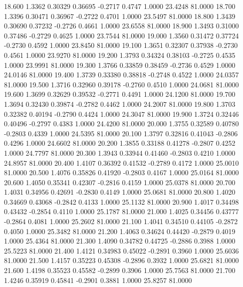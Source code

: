  18.600   1.3362   0.30329   0.36695  -0.2717   0.4747   1.0000  23.4248  81.0000
  18.700   1.3396   0.30471   0.36967  -0.2722   0.4701   1.0000  23.5497  81.0000
  18.800   1.3439   0.30690   0.37232  -0.2726   0.4661   1.0000  23.6558  81.0000
  18.900   1.3493   0.31000   0.37486  -0.2729   0.4625   1.0000  23.7544  81.0000
  19.000   1.3560   0.31472   0.37724  -0.2730   0.4592   1.0000  23.8450  81.0000
  19.100   1.3651   0.32307   0.37938  -0.2730   0.4561   1.0000  23.9270  81.0000
  19.200   1.3793   0.34324   0.38103  -0.2725   0.4535   1.0000  23.9991  81.0000
  19.300   1.3766   0.33859   0.38459  -0.2736   0.4529   1.0000  24.0146  81.0000
  19.400   1.3739   0.33380   0.38818  -0.2748   0.4522   1.0000  24.0357  81.0000
  19.500   1.3716   0.32960   0.39178  -0.2760   0.4510   1.0000  24.0681  81.0000
  19.600   1.3699   0.32629   0.39532  -0.2771   0.4491   1.0000  24.1200  81.0000
  19.700   1.3694   0.32430   0.39874  -0.2782   0.4462   1.0000  24.2007  81.0000
  19.800   1.3703   0.32382   0.40194  -0.2790   0.4424   1.0000  24.3047  81.0000
  19.900   1.3724   0.32446   0.40496  -0.2797   0.4383   1.0000  24.4200  81.0000
  20.000   1.3755   0.32589   0.40780  -0.2803   0.4339   1.0000  24.5395  81.0000
  20.100   1.3797   0.32816   0.41043  -0.2806   0.4296   1.0000  24.6602  81.0000
  20.200   1.3855   0.33188   0.41278  -0.2807   0.4252   1.0000  24.7797  81.0000
  20.300   1.3943   0.33944   0.41460  -0.2803   0.4210   1.0000  24.8957  81.0000
  20.400   1.4107   0.36392   0.41532  -0.2789   0.4172   1.0000  25.0010  81.0000
  20.500   1.4076   0.35826   0.41920  -0.2803   0.4167   1.0000  25.0164  81.0000
  20.600   1.4050   0.35341   0.42307  -0.2816   0.4159   1.0000  25.0378  81.0000
  20.700   1.4031   0.34956   0.42691  -0.2830   0.4149   1.0000  25.0681  81.0000
  20.800   1.4020   0.34669   0.43068  -0.2842   0.4133   1.0000  25.1132  81.0000
  20.900   1.4017   0.34498   0.43432  -0.2854   0.4110   1.0000  25.1787  81.0000
  21.000   1.4025   0.34456   0.43777  -0.2864   0.4081   1.0000  25.2602  81.0000
  21.100   1.4041   0.34510   0.44105  -0.2872   0.4050   1.0000  25.3482  81.0000
  21.200   1.4063   0.34624   0.44420  -0.2879   0.4019   1.0000  25.4364  81.0000
  21.300   1.4090   0.34782   0.44725  -0.2886   0.3988   1.0000  25.5223  81.0000
  21.400   1.4121   0.34983   0.45022  -0.2891   0.3960   1.0000  25.6036  81.0000
  21.500   1.4157   0.35223   0.45308  -0.2896   0.3932   1.0000  25.6821  81.0000
  21.600   1.4198   0.35523   0.45582  -0.2899   0.3906   1.0000  25.7563  81.0000
  21.700   1.4246   0.35919   0.45841  -0.2901   0.3881   1.0000  25.8257  81.0000
